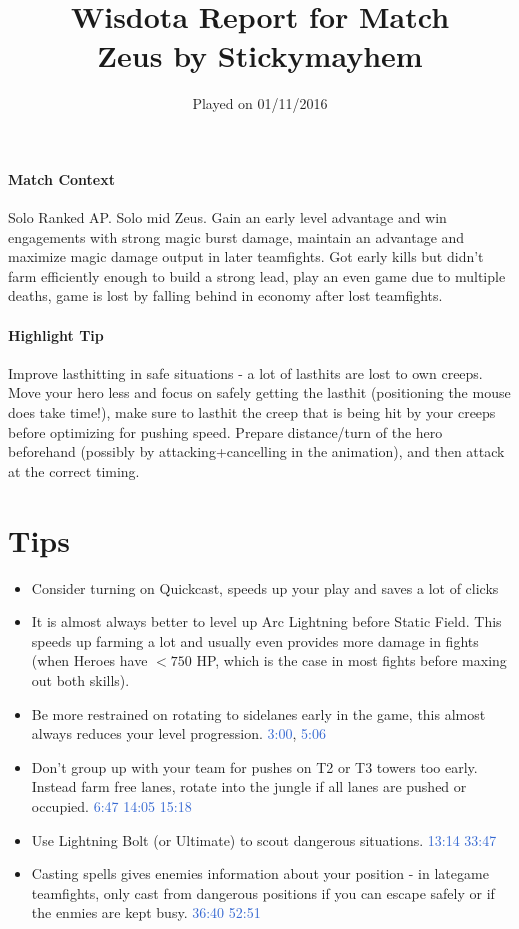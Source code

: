 \documentclass{article}
\title{Wisdota Report for Match \matchid \\
Zeus by Stickymayhem}
\date{Played on 01/11/2016}
\author{}
\newcommand{\logref}[1]{\textcolor{highlight}{#1}}
\newcommand{\nnsection}[1]
{\section*{#1}
\addcontentsline{toc}{section}{#1}
}
\begin{document}
\pagecolor{WisdotaBackground}
\color{white}

\maketitle
\thispagestyle{first-page}

\paragraph{Match Context}
Solo Ranked AP. Solo mid Zeus. Gain an early level advantage and win engagements with strong magic burst damage, maintain an advantage and maximize magic damage output in later teamfights. Got early kills but didn't farm efficiently enough to build a strong lead, play an even game due to multiple deaths, game is lost by falling behind in economy after lost teamfights.

\paragraph{Highlight Tip}
Improve lasthitting in safe situations - a lot of lasthits are lost to own creeps. Move your hero less and focus on safely getting the lasthit (positioning the mouse does take time!), make sure to lasthit the creep that is being hit by your creeps before optimizing for pushing speed. Prepare distance/turn of the hero beforehand (possibly by attacking+cancelling in the animation), and then attack at the correct timing.  

\nnsection{Tips}

\begin{itemize}
    \item Consider turning on Quickcast, speeds up your play and saves a lot of clicks
    \item It is almost always better to level up Arc Lightning before Static Field.
    This speeds up farming a lot and usually even provides more damage in fights (when Heroes have $<750$ HP, which is the case in most fights before maxing out both skills).
    \item Be more restrained on rotating to sidelanes early in the game, this almost always reduces your level progression. \logref{3:00}, \logref{5:06}
    \item Don't group up with your team for pushes on T2 or T3 towers too early. Instead farm free lanes, rotate into the jungle if all lanes are pushed or occupied. \logref{6:47} \logref{14:05} \logref{15:18}
    \item Use Lightning Bolt (or Ultimate) to scout dangerous situations. \logref{13:14} \logref{33:47}  
    \item Casting spells gives enemies information about your position - in lategame teamfights, only cast from dangerous positions if you can escape safely or if the enmies are kept busy. \logref{36:40} \logref{52:51}
\end{itemize}
\end{document}
